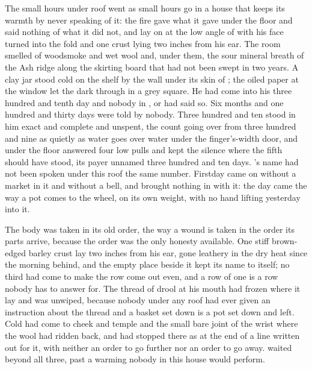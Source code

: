 
The small hours under  roof went as small hours go in a house that keeps its warmth by never speaking of it: the fire gave what it gave under the floor and said nothing of what it did not, and  lay on  at the low angle of  with his face turned into the fold and one crust lying two inches from his ear. The room smelled of woodsmoke and wet wool and, under them, the sour mineral breath of the Ash ridge along the skirting board that had not been swept in two years. A clay jar stood cold on the shelf by the wall under its skin of ; the oiled paper at the window let the dark through in a grey square. He had come into his three hundred and tenth day and nobody in ,  or  had said so. Six months and one hundred and thirty days were told by nobody. Three hundred and ten stood in him exact and complete and unspent, the count going over from three hundred and nine as quietly as water goes over water under the finger's-width door, and under the floor  answered four low pulls and kept the silence where the fifth should have stood, its payer unnamed three hundred and ten days. 's name had not been spoken under this roof the same number. Firstday came on without a market in it and without a bell, and brought nothing in with it: the day came the way a pot comes to the wheel, on its own weight, with no hand lifting yesterday into it.

The body was taken in its old order, the way a wound is taken in the order its parts arrive, because the order was the only honesty available. One stiff brown-edged barley crust lay two inches from his ear, gone leathery in the dry heat since the morning behind, and the empty place beside it kept its name to itself; no third had come to make the row come out even, and a row of one is a row nobody has to answer for. The thread of drool at his mouth had frozen where it lay and was unwiped, because nobody under any roof had ever given an instruction about the thread and a basket set down is a pot set down and left. Cold had come to cheek and temple and the small bare joint of the wrist where the wool had ridden back, and had stopped there as at the end of a line written out for it, with neither an order to go further nor an order to go away.  waited beyond all three, past a warming nobody in this house would perform.

